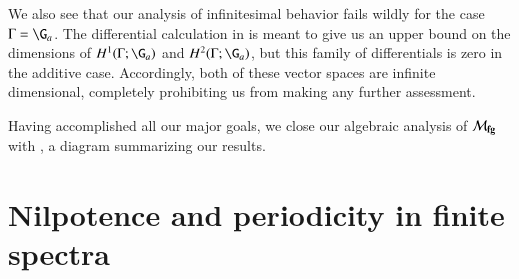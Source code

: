 \begin{remark}
We also see that our analysis of infinitesimal behavior fails wildly for the case $\Gamma = \G_a$.  The differential calculation in  is meant to give us an upper bound on the dimensions of $H^1(\Gamma; \G_a)$ and $H^2(\Gamma; \G_a)$, but this family of differentials is zero in the additive case.  Accordingly, both of these vector spaces are infinite dimensional, completely prohibiting us from making any further assessment.
\end{remark}

Having accomplished all our major goals, we close our algebraic analysis of $\mathcal{M}_{\mathbf{fg}}$ with , a diagram summarizing our results.










\section{Nilpotence and periodicity in finite spectra}\label{NilpotenceAndPeriodicity}


